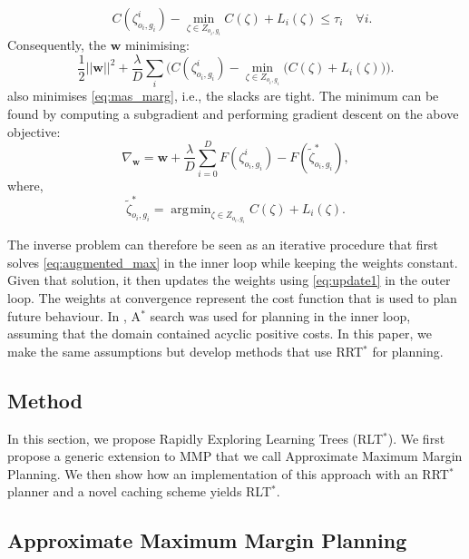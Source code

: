 \documentclass[a4paper,11pt]{report}
\DeclareMathOperator*{\argmin}{\arg\!\min}
\begin{document}
\begin{equation}
	 \quad C(\zeta^i_{o_i,g_i}) - \min_{\zeta \in Z_{o_i,g_i}} C(\zeta) + L_i(\zeta)  \leq \tau_i  \quad \forall i.
\end{equation}
Consequently, the $\mathbf{w}$ minimising:
\begin{equation}
	\frac{1}{2}||\mathbf{w}||^2 + \frac{\lambda}{D} \sum_i \big( C(\zeta^i_{o_i,g_i}) - \min_{\zeta \in Z_{o_i,g_i}}\big(C(\zeta) + L_i(\zeta)\big) \big) \big. \label{eq:unconstrained}
\end{equation}
also minimises \eqref{eq:mas_marg}, i.e., the slacks are tight.
The minimum can be found by computing a subgradient and performing gradient descent on the above objective:
\begin{equation}
	\nabla_{\mathbf{w}} =\mathbf{w} +  \frac{\lambda}{D} \sum_{i=0}^D F(\zeta^i_{o_i,g_i}) - F(\tilde{\zeta}^*_{o_i,g_i}), \label{eq:update1}
\end{equation}
where,
\begin{equation}
	\tilde{\zeta}^*_{o_i,g_i} = \argmin_{\zeta \in Z_{o_i,g_i}} C(\zeta) + L_i(\zeta). \label{eq:augmented_max}
\end{equation}

The inverse problem can therefore be seen as an iterative procedure that first solves \eqref{eq:augmented_max} in the inner loop while keeping the weights constant. Given that solution, it then updates the weights using \eqref{eq:update1} in the outer loop. The weights at convergence represent the cost function that is used to plan future behaviour. In \cite{ratliff2006maximum}, A$^*$ search was used for planning in the inner loop, assuming that the domain contained acyclic positive costs. In this paper, we make the same assumptions but develop methods that use RRT$^*$ for planning.

\subsection{Method}
	In this section, we propose Rapidly Exploring Learning Trees (RLT$^*$).  We first propose a generic extension to MMP that we call Approximate Maximum Margin Planning.  We then show how an implementation of this approach with an RRT$^*$ planner and a novel caching scheme yields RLT$^*$.

	\subsection{Approximate Maximum Margin Planning \label{subsec:ammp}}
\end{document}
